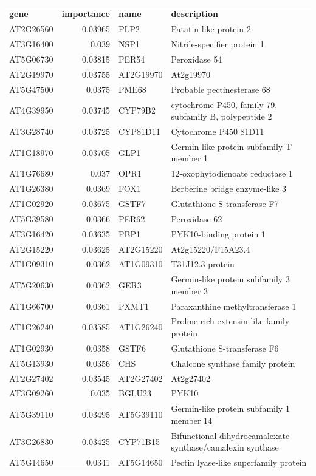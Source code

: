 \documentclass[11pt]{article}
\begin{document}
\begin{center}
\begin{tabular}{lrll}
gene & importance & name & description\\
\hline
AT2G26560 & 0.03965 & PLP2 & Patatin-like protein 2\\
AT3G16400 & 0.039 & NSP1 & Nitrile-specifier protein 1\\
AT5G06730 & 0.03815 & PER54 & Peroxidase 54\\
AT2G19970 & 0.03755 & AT2G19970 & At2g19970\\
AT5G47500 & 0.0375 & PME68 & Probable pectinesterase 68\\
AT4G39950 & 0.03745 & CYP79B2 & cytochrome P450, family 79, subfamily B, polypeptide 2\\
AT3G28740 & 0.03725 & CYP81D11 & Cytochrome P450 81D11\\
AT1G18970 & 0.03705 & GLP1 & Germin-like protein subfamily T member 1\\
AT1G76680 & 0.037 & OPR1 & 12-oxophytodienoate reductase 1\\
AT1G26380 & 0.0369 & FOX1 & Berberine bridge enzyme-like 3\\
AT1G02920 & 0.03675 & GSTF7 & Glutathione S-transferase F7\\
AT5G39580 & 0.0366 & PER62 & Peroxidase 62\\
AT3G16420 & 0.03635 & PBP1 & PYK10-binding protein 1\\
AT2G15220 & 0.03625 & AT2G15220 & At2g15220/F15A23.4\\
AT1G09310 & 0.0362 & AT1G09310 & T31J12.3 protein\\
AT5G20630 & 0.0362 & GER3 & Germin-like protein subfamily 3 member 3\\
AT1G66700 & 0.0361 & PXMT1 & Paraxanthine methyltransferase 1\\
AT1G26240 & 0.03585 & AT1G26240 & Proline-rich extensin-like family protein\\
AT1G02930 & 0.0358 & GSTF6 & Glutathione S-transferase F6\\
AT5G13930 & 0.0356 & CHS & Chalcone synthase family protein\\
AT2G27402 & 0.03545 & AT2G27402 & At2g27402\\
AT3G09260 & 0.035 & BGLU23 & PYK10\\
AT5G39110 & 0.03495 & AT5G39110 & Germin-like protein subfamily 1 member 14\\
AT3G26830 & 0.03425 & CYP71B15 & Bifunctional dihydrocamalexate synthase/camalexin synthase\\
AT5G14650 & 0.0341 & AT5G14650 & Pectin lyase-like superfamily protein\\
\end{tabular}
\end{center}
\end{document}
